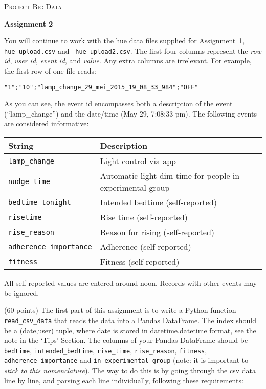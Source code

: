 \documentclass[a4paper]{report}
\theoremstyle{definition}
\newcommand{\blankline}{\par\vspace{5mm}}
\begin{document}
\begin{center}
	\textsc{\Large Project Big Data}
	\blankline
	
	\textbf{\large Assignment 2}
\end{center}

You will continue to work with the hue data files supplied for
Assignment~1, {\small\texttt{hue\_upload.csv}} and \texttt{\small
hue\_upload2.csv}.  The first four columns represent the \emph{row id},
\emph{user id}, \emph{event id}, and \emph{value}. Any extra columns
are irrelevant. For example, the first row of one file reads:

\texttt{\small "1";"10";"lamp\_change\_29\_mei\_2015\_19\_08\_33\_984";"OFF"}

As you can see, the event id encompasses both a description of
the event (``lamp\_change'') and the date/time (May 29, 7:08:33 pm).
The following events are considered informative:

\begin{center}
\begin{tabular}{|l|l|}
\hline
\textbf{String}		& \textbf{Description} \\
\hline
\texttt{\small lamp\_change}		& Light control via app \\
\texttt{\small nudge\_time}		& Automatic light dim time for people in experimental group \\
\texttt{\small bedtime\_tonight}	& Intended bedtime (self-reported) \\
\texttt{\small risetime}		& Rise time (self-reported) \\
\texttt{\small rise\_reason}		& Reason for rising (self-reported) \\
\texttt{\small adherence\_importance}	& Adherence (self-reported) \\
\texttt{\small fitness}			& Fitness (self-reported) \\
\hline
\end{tabular}
\end{center}

All self-reported values are entered around noon. Records with other
events may be ignored.

(60 points) The first part of this assignment is to write a Python
function \texttt{\small read\_csv\_data} that reads the data into a
Pandas DataFrame. The index should be a (date,user) tuple, where date
is stored in datetime.datetime format, see the note in the `Tips' Section.
The columns of your Pandas DataFrame should be \texttt{\small bedtime},
\texttt{\small intended\_bedtime}, \texttt{\small rise\_time},
\texttt{\small rise\_reason}, \texttt{\small fitness}, \texttt{\small
adherence\_importance} and \texttt{\small in\_experimental\_group}
(note: it is important to \emph{stick to this nomenclature}). The way
to do this is by going through the csv data line by line, and parsing
each line individually, following these requirements:
\end{document}
